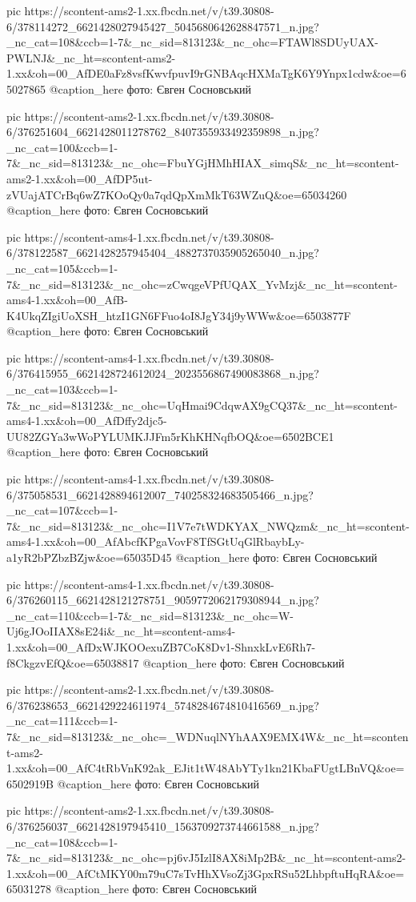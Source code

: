      pic https://scontent-ams2-1.xx.fbcdn.net/v/t39.30808-6/378114272_6621428027945427_5045680642628847571_n.jpg?_nc_cat=108&ccb=1-7&_nc_sid=813123&_nc_ohc=FTAWl8SDUyUAX-PWLNJ&_nc_ht=scontent-ams2-1.xx&oh=00_AfDE0aFz8vsfKwvfpuvI9rGNBAqcHXMaTgK6Y9Ynpx1cdw&oe=65027865
     @caption_here фото: Євген Сосновський

     pic https://scontent-ams2-1.xx.fbcdn.net/v/t39.30808-6/376251604_6621428011278762_8407355933492359898_n.jpg?_nc_cat=100&ccb=1-7&_nc_sid=813123&_nc_ohc=FbuYGjHMhHIAX_simqS&_nc_ht=scontent-ams2-1.xx&oh=00_AfDP5ut-zVUajATCrBq6wZ7KOoQy0a7qdQpXmMkT63WZuQ&oe=65034260
     @caption_here фото: Євген Сосновський

     pic https://scontent-ams4-1.xx.fbcdn.net/v/t39.30808-6/378122587_6621428257945404_4882737035905265040_n.jpg?_nc_cat=105&ccb=1-7&_nc_sid=813123&_nc_ohc=zCwqgeVPfUQAX_YvMzj&_nc_ht=scontent-ams4-1.xx&oh=00_AfB-K4UkqZIgiUoXSH_htzI1GN6FFuo4oI8JgY34j9yWWw&oe=6503877F
     @caption_here фото: Євген Сосновський

     pic https://scontent-ams4-1.xx.fbcdn.net/v/t39.30808-6/376415955_6621428724612024_2023556867490083868_n.jpg?_nc_cat=103&ccb=1-7&_nc_sid=813123&_nc_ohc=UqHmai9CdqwAX9gCQ37&_nc_ht=scontent-ams4-1.xx&oh=00_AfDffy2djc5-UU82ZGYa3wWoPYLUMKJJFm5rKhKHNqfbOQ&oe=6502BCE1
     @caption_here фото: Євген Сосновський

     pic https://scontent-ams4-1.xx.fbcdn.net/v/t39.30808-6/375058531_6621428894612007_740258324683505466_n.jpg?_nc_cat=107&ccb=1-7&_nc_sid=813123&_nc_ohc=I1V7e7tWDKYAX_NWQzm&_nc_ht=scontent-ams4-1.xx&oh=00_AfAbcfKPgaVovF8TfSGtUqGlRbaybLy-a1yR2bPZbzBZjw&oe=65035D45
     @caption_here фото: Євген Сосновський

     pic https://scontent-ams4-1.xx.fbcdn.net/v/t39.30808-6/376260115_6621428121278751_9059772062179308944_n.jpg?_nc_cat=110&ccb=1-7&_nc_sid=813123&_nc_ohc=W-Uj6gJOoIIAX8sE24i&_nc_ht=scontent-ams4-1.xx&oh=00_AfDxWJKOOexuZB7CoK8Dv1-ShnxkLvE6Rh7-f8CkgzvEfQ&oe=65038817
     @caption_here фото: Євген Сосновський

     pic https://scontent-ams2-1.xx.fbcdn.net/v/t39.30808-6/376238653_6621429224611974_5748284674810416569_n.jpg?_nc_cat=111&ccb=1-7&_nc_sid=813123&_nc_ohc=_WDNuqlNYhAAX9EMX4W&_nc_ht=scontent-ams2-1.xx&oh=00_AfC4tRbVnK92ak_EJit1tW48AbYTy1kn21KbaFUgtLBnVQ&oe=6502919B
     @caption_here фото: Євген Сосновський

     pic https://scontent-ams2-1.xx.fbcdn.net/v/t39.30808-6/376256037_6621428197945410_1563709273744661588_n.jpg?_nc_cat=108&ccb=1-7&_nc_sid=813123&_nc_ohc=pj6vJ5IzlI8AX8iMp2B&_nc_ht=scontent-ams2-1.xx&oh=00_AfCtMKY00m79uC7sTvHhXVsoZj3GpxRSu52LhbpftuHqRA&oe=65031278
     @caption_here фото: Євген Сосновський


